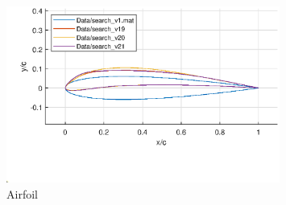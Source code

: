 \documentclass{article}
\begin{document}
\begin{figure}[H]
    \centering
    \includegraphics[width=0.8\textwidth]{figures/hiRe_geometry_21.eps}
    \caption{Airfoil}
    \label{fig:v21_geometry}
\end{figure}
\end{document}
